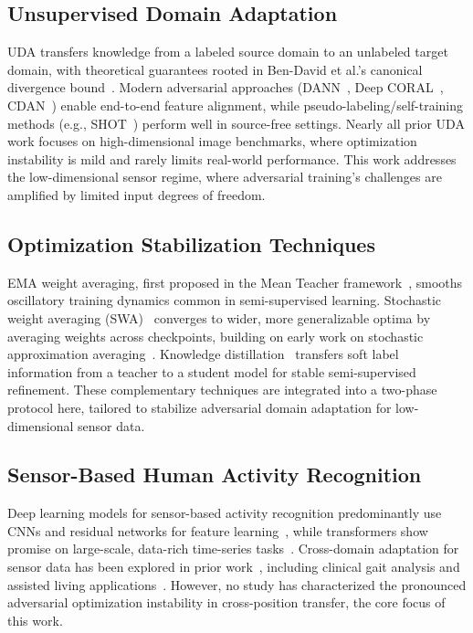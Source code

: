 \documentclass[conference]{IEEEtran}
\begin{document}
\subsection{Unsupervised Domain Adaptation}
UDA transfers knowledge from a labeled source domain to an unlabeled target domain, with theoretical guarantees rooted in Ben-David et al.’s canonical divergence bound~\cite{ben2010theory}. Modern adversarial approaches (DANN~\cite{ganin2016domain}, Deep CORAL~\cite{sun2016deep}, CDAN~\cite{long2018conditional}) enable end-to-end feature alignment, while pseudo-labeling/self-training methods (e.g., SHOT~\cite{liang2020we}) perform well in source-free settings. Nearly all prior UDA work focuses on high-dimensional image benchmarks, where optimization instability is mild and rarely limits real-world performance. This work addresses the low-dimensional sensor regime, where adversarial training’s challenges are amplified by limited input degrees of freedom.

\subsection{Optimization Stabilization Techniques}
EMA weight averaging, first proposed in the Mean Teacher framework~\cite{tarvainen2017mean}, smooths oscillatory training dynamics common in semi-supervised learning. Stochastic weight averaging (SWA)~\cite{izmailov2018averaging} converges to wider, more generalizable optima by averaging weights across checkpoints, building on early work on stochastic approximation averaging~\cite{polyak1992acceleration}. Knowledge distillation~\cite{hinton2015distilling} transfers soft label information from a teacher to a student model for stable semi-supervised refinement. These complementary techniques are integrated into a two-phase protocol here, tailored to stabilize adversarial domain adaptation for low-dimensional sensor data.

\subsection{Sensor-Based Human Activity Recognition}
Deep learning models for sensor-based activity recognition predominantly use CNNs and residual networks for feature learning~\cite{ordonez2016deep,he2016deep}, while transformers show promise on large-scale, data-rich time-series tasks~\cite{nie2023patchtst}. Cross-domain adaptation for sensor data has been explored in prior work~\cite{chang2020systematic}, including clinical gait analysis and assisted living applications~\cite{ZhangH07,ZhangH08}. However, no study has characterized the pronounced adversarial optimization instability in cross-position transfer, the core focus of this work.
\end{document}
